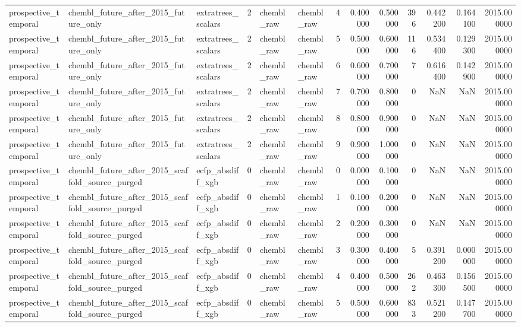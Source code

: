 \begin{longtable}{lllrllrrrrrrr}
prospective\_temporal & chembl\_future\_after\_2015\_future\_only & extratrees\_scalars & 2 & chembl\_raw & chembl\_raw & 4 & 0.400000 & 0.500000 & 396 & 0.442200 & 0.164100 & 2015.000000 \\
prospective\_temporal & chembl\_future\_after\_2015\_future\_only & extratrees\_scalars & 2 & chembl\_raw & chembl\_raw & 5 & 0.500000 & 0.600000 & 116 & 0.534400 & 0.129300 & 2015.000000 \\
prospective\_temporal & chembl\_future\_after\_2015\_future\_only & extratrees\_scalars & 2 & chembl\_raw & chembl\_raw & 6 & 0.600000 & 0.700000 & 7 & 0.616400 & 0.142900 & 2015.000000 \\
prospective\_temporal & chembl\_future\_after\_2015\_future\_only & extratrees\_scalars & 2 & chembl\_raw & chembl\_raw & 7 & 0.700000 & 0.800000 & 0 & NaN & NaN & 2015.000000 \\
prospective\_temporal & chembl\_future\_after\_2015\_future\_only & extratrees\_scalars & 2 & chembl\_raw & chembl\_raw & 8 & 0.800000 & 0.900000 & 0 & NaN & NaN & 2015.000000 \\
prospective\_temporal & chembl\_future\_after\_2015\_future\_only & extratrees\_scalars & 2 & chembl\_raw & chembl\_raw & 9 & 0.900000 & 1.000000 & 0 & NaN & NaN & 2015.000000 \\
prospective\_temporal & chembl\_future\_after\_2015\_scaffold\_source\_purged & ecfp\_absdiff\_xgb & 0 & chembl\_raw & chembl\_raw & 0 & 0.000000 & 0.100000 & 0 & NaN & NaN & 2015.000000 \\
prospective\_temporal & chembl\_future\_after\_2015\_scaffold\_source\_purged & ecfp\_absdiff\_xgb & 0 & chembl\_raw & chembl\_raw & 1 & 0.100000 & 0.200000 & 0 & NaN & NaN & 2015.000000 \\
prospective\_temporal & chembl\_future\_after\_2015\_scaffold\_source\_purged & ecfp\_absdiff\_xgb & 0 & chembl\_raw & chembl\_raw & 2 & 0.200000 & 0.300000 & 0 & NaN & NaN & 2015.000000 \\
prospective\_temporal & chembl\_future\_after\_2015\_scaffold\_source\_purged & ecfp\_absdiff\_xgb & 0 & chembl\_raw & chembl\_raw & 3 & 0.300000 & 0.400000 & 5 & 0.391200 & 0.000000 & 2015.000000 \\
prospective\_temporal & chembl\_future\_after\_2015\_scaffold\_source\_purged & ecfp\_absdiff\_xgb & 0 & chembl\_raw & chembl\_raw & 4 & 0.400000 & 0.500000 & 262 & 0.463300 & 0.156500 & 2015.000000 \\
prospective\_temporal & chembl\_future\_after\_2015\_scaffold\_source\_purged & ecfp\_absdiff\_xgb & 0 & chembl\_raw & chembl\_raw & 5 & 0.500000 & 0.600000 & 833 & 0.521200 & 0.147700 & 2015.000000 \\

\end{longtable}
